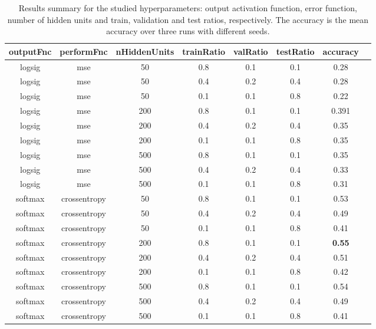 \documentclass{article}[11pt]
\begin{document}
\begin{table}[h!]
  \begin{center}
    
    
    \begin{tabular}{cccccccc}
outputFnc & performFnc & nHiddenUnits & trainRatio & valRatio & testRatio & accuracy \\ 
\hline 
logsig & mse & 50 & 0.8 & 0.1 & 0.1 & 0.28 \\ 
logsig & mse & 50 & 0.4 & 0.2 & 0.4 & 0.28 \\ 
logsig & mse & 50 & 0.1 & 0.1 & 0.8 & 0.22\\ 
logsig & mse & 200 & 0.8 & 0.1 & 0.1 & 0.391 \\ 
logsig & mse & 200 & 0.4 & 0.2 & 0.4 & 0.35 \\ 
logsig & mse & 200 & 0.1 & 0.1 & 0.8 & 0.35 \\ 
logsig & mse & 500 & 0.8 & 0.1 & 0.1 & 0.35 \\ 
logsig & mse & 500 & 0.4 & 0.2 & 0.4 & 0.33 \\ 
logsig & mse & 500 & 0.1 & 0.1 & 0.8 & 0.31 \\ 
softmax & crossentropy & 50 & 0.8 & 0.1 & 0.1 & 0.53 \\ 
softmax & crossentropy & 50 & 0.4 & 0.2 & 0.4 & 0.49 \\ 
softmax & crossentropy & 50 & 0.1 & 0.1 & 0.8 & 0.41 \\ 
softmax & crossentropy & 200 & 0.8 & 0.1 & 0.1 & \textbf{0.55} \\ 
softmax & crossentropy & 200 & 0.4 & 0.2 & 0.4 & 0.51 \\ 
softmax & crossentropy & 200 & 0.1 & 0.1 & 0.8 & 0.42 \\ 
softmax & crossentropy & 500 & 0.8 & 0.1 & 0.1 & 0.54 \\ 
softmax & crossentropy & 500 & 0.4 & 0.2 & 0.4 & 0.49 \\ 
softmax & crossentropy & 500 & 0.1 & 0.1 & 0.8& 0.41 \\ 
 
\end{tabular}
    \caption{Results summary for the studied hyperparameters: output activation function, error function, number of hidden units and train, validation and test ratios, respectively. The accuracy is the mean accuracy over three runs with different seeds.}
    \label{tab:results}
  \end{center}
\end{table}
\end{document}
